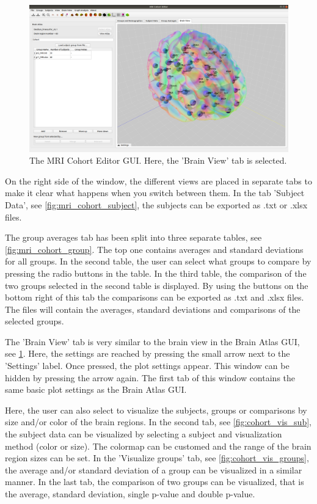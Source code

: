 \documentclass{article}
\begin{document}
\begin{figure}[H]
    \centering
    \includegraphics[width=0.9\linewidth]{cohort_brain_view_down.png}
    \caption{The MRI Cohort Editor GUI. Here, the 'Brain View' tab is selected.}
    \label{fig:cohort_brain_view_down}
\end{figure}

On the right side of the window, the different views are placed in separate tabs to make it clear what happens when you switch between them. In the tab 'Subject Data', see \cref{fig:mri_cohort_subject}, the subjects can be exported as .txt or .xlsx files.

The group averages tab has been split into three separate tables, see \cref{fig:mri_cohort_group}. The top one contains averages and standard deviations for all groups. In the second table, the user can select what groups to compare by pressing the radio buttons in the table. In the third table, the comparison of the two groups selected in the second table is displayed. By using the buttons on the bottom right of this tab the comparisons can be exported as .txt and .xlsx files. The files will contain the averages, standard deviations and comparisons of the selected groups.

The 'Brain View' tab is very similar to the brain view in the Brain Atlas GUI, see \cref{fig:cohort_brain_view_down}. Here, the settings are reached by pressing the small arrow next to the 'Settings' label. Once pressed, the plot settings appear. This window can be hidden by pressing the arrow again. The first tab of this window contains the same basic plot settings as the Brain Atlas GUI.

Here, the user can also select to visualize the subjects, groups or comparisons by size and/or color of the brain regions. In the second tab, see \cref{fig:cohort_vis_sub}, the subject data can be visualized by selecting a subject and visualization method (color or size). The colormap can be customed and the range of the brain region sizes can be set. In the 'Visualize groups' tab, see \cref{fig:cohort_vis_groups}, the average and/or standard deviation of a group can be visualized in a similar manner. In the last tab, the comparison of two groups can be visualized, that is the average, standard deviation, single p-value and double p-value. 
\end{document}
